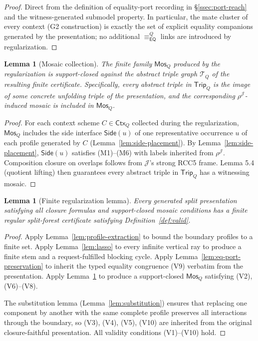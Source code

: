 \documentclass[11pt]{article}
\newtheorem{lemma}[theorem]{Lemma}
\newcommand{\EQ}{\mathsf{EQ}}
\newcommand{\J}{\mathcal J}
\newcommand{\Mos}{\mathsf{Mos}}
\newcommand{\Ctx}{\mathsf{Ctx}}
\newcommand{\eqc}{\equiv_{\EQ}}
\newcommand{\Trip}{\mathsf{Trip}}
\newcommand{\Side}{\mathsf{Side}}
\begin{document}
\begin{proof}
Direct from the definition of equality-port recording in
\S\ref{ssec:port-reach} and the witness-generated submodel
property.  In particular, the mate cluster of every context (G2
construction) is exactly the set of explicit equality companions
generated by the presentation; no additional $\eqc^Q$ links are
introduced by regularization.
\end{proof}

\begin{lemma}[Mosaic collection]\label{lem:mosaic-collection}
The finite family $\Mos_Q$ produced by the regularization is
support-closed against the abstract triple graph $\mathcal T_Q$ of
the resulting finite certificate.  Specifically, every abstract
triple in $\Trip_Q$ is the image of some concrete unfolding triple
of the presentation, and the corresponding $\rho^\J$-induced mosaic
is included in $\Mos_Q$.
\end{lemma}

\begin{proof}
For each context scheme $C\in\Ctx_Q$ collected during the
regularization, $\Mos_Q$ includes the side interface
$\Side(u)$ of one representative occurrence $u$ of each profile
generated by $C$ (Lemma~\ref{lem:side-placement}).  By
Lemma~\ref{lem:side-placement}, $\Side(u)$ satisfies (M1)--(M6)
with labels inherited from $\rho^\J$.  Composition closure on
overlaps follows from $\J$'s strong RCC5 frame.  Lemma 5.4 (quotient
lifting) then guarantees every abstract triple in $\Trip_Q$ has a
witnessing mosaic.
\end{proof}

\begin{lemma}[Finite regularization lemma]\label{lem:regularization}
Every generated split presentation satisfying all closure formulas
and support-closed mosaic conditions has a finite regular
split-forest certificate satisfying Definition~\ref{def:valid}.
\end{lemma}

\begin{proof}
Apply Lemma~\ref{lem:profile-extraction} to bound the boundary
profiles to a finite set.  Apply Lemma~\ref{lem:lasso} to every
infinite vertical ray to produce a finite stem and a
request-fulfilled blocking cycle.  Apply
Lemma~\ref{lem:eq-port-preservation} to inherit the typed equality
congruence (V9) verbatim from the presentation.  Apply
Lemma~\ref{lem:mosaic-collection} to produce a support-closed
$\Mos_Q$ satisfying (V2), (V6)--(V8).

The substitution lemma (Lemma~\ref{lem:substitution}) ensures that
replacing one component by another with the same complete profile
preserves all interactions through the boundary, so (V3), (V4),
(V5), (V10) are inherited from the original closure-faithful
presentation.  All validity conditions (V1)--(V10) hold.
\end{proof}
\end{document}
